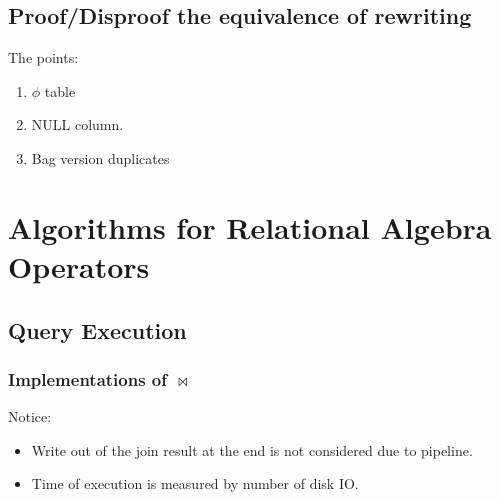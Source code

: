 \documentclass[a4paper]{report}
\begin{document}
\subsection{Proof/Disproof the equivalence of rewriting}
The  points: 
\begin{enumerate}
\item $\phi$ table
\item NULL column. 
\item Bag version duplicates
\end{enumerate}



\section{Algorithms for Relational Algebra Operators}
\subsection{Query Execution}
\subsubsection{Implementations of $\bowtie$}

Notice:
\begin{itemize}
\item Write out of the join result at the end is not considered due to pipeline.
\item Time of execution is measured by number of disk IO. 
\end{itemize}
\end{document}
